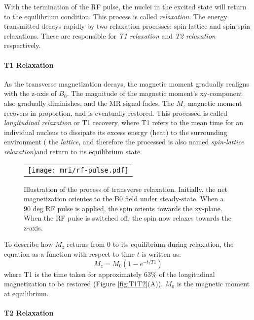 With the termination of the RF pulse, the nuclei in the excited state will return to the equilibrium condition. This process is called \textit{relaxation}. 
The energy transmitted decays rapidly by two relaxation processes:  spin-lattice and spin-spin relaxations. These are responsible for \textit{T1 relaxation} and \textit{T2 relaxation} respectively.

\paragraph{T1 Relaxation} 
As the transverse magnetization decays, the magnetic moment gradually realigns with the z-axis of $B_0$. 
The magnitude of the magnetic moment's xy-component also gradually diminishes, and the MR signal fades. 
The $M_z$ magnetic moment recovers in proportion, and is eventually restored. 
This processed is called \textit{longitudinal relaxation} or T1 recovery, where T1 refers to the mean time for an individual nucleus to
dissipate its excess energy (heat) to the surrounding environment ( the \textit{lattice}, and therefore the processed is also named \textit{spin-lattice relaxation})and return to its equilibrium state. 

\begin{figure}[htb]
\begin{center}
\begin{tabular}{c}
\texttt{[image: mri/rf-pulse.pdf]}
\end{tabular}
\caption{Illustration of the process of transverse relaxation. Initially, the net magnetization orientes to the B0 field under steady-state. When a 90 deg RF pulse is applied, the spin orients towards the xy-plane. When the RF pulse is switched off, the spin now relaxes towards the z-axis.  } \label{fig:relaxation}
\end{center}
\end{figure}

To describe how $M_z$ returns from 0 to its equilibrium during relaxation, the equation as a
function with respect to time $t$ is written as: 
$$M_z = M_0 (1 - e^{-t/T1})$$
where T1 is the time taken for approximately 63$\%$ of the longitudinal magnetization to be restored (Figure \ref{fig:T1T2}(A)). 
$M_0$ is the magnetic moment at equilibrium. 

\paragraph{T2 Relaxation}

